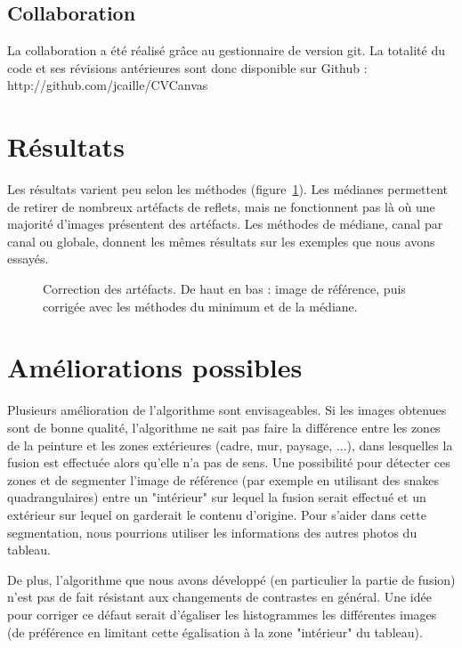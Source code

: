 \documentclass[12pt,a4paper]{article}
\begin{document}
\subsection{Collaboration}
La collaboration a été réalisé grâce au gestionnaire de version git. La totalité du code et ses révisions antérieures sont donc disponible sur Github : http://github.com/jcaille/CVCanvas

\section{Résultats}
\label{results}
Les résultats varient peu selon les méthodes (figure~\ref{mediane}). Les médianes permettent de retirer de nombreux artéfacts de reflets, mais ne fonctionnent pas là où une majorité d'images présentent des artéfacts. Les méthodes de médiane, canal par canal ou globale, donnent les mêmes résultats sur les exemples que nous avons essayés.
\begin{figure}
\centering
\begin{minipage}{0.6\linewidth}
\end{minipage}
\begin{minipage}{0.6\linewidth}
\end{minipage}
\begin{minipage}{0.6\linewidth}
\end{minipage}
\caption{Correction des artéfacts. De haut en bas : image de référence, puis corrigée avec les méthodes du minimum et de la médiane.}
\label{mediane}
\end{figure} 
\section{Améliorations possibles}

Plusieurs amélioration de l'algorithme sont envisageables. Si les images obtenues sont de bonne qualité, l'algorithme ne sait pas faire la différence entre les zones de la peinture et les zones extérieures (cadre, mur, paysage, ...), dans lesquelles la fusion est effectuée alors qu'elle n'a pas de sens. Une possibilité pour détecter ces zones et de segmenter l'image de référence (par exemple en utilisant des snakes quadrangulaires) entre un "intérieur" sur lequel la fusion serait effectué et un extérieur sur lequel on garderait le contenu d'origine. Pour s'aider dans cette segmentation, nous pourrions utiliser les informations des autres photos du tableau.

De plus, l'algorithme que nous avons développé (en particulier la partie de fusion) n'est pas de fait résistant aux changements de contrastes en général. Une idée pour corriger ce défaut serait d'égaliser les histogrammes les différentes images (de préférence en limitant cette égalisation à la zone "intérieur" du tableau).


\end{document}
